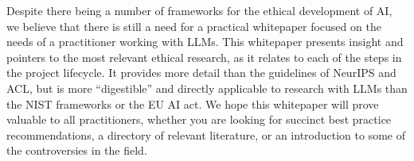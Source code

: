 Despite there being a number of frameworks for the ethical development of AI, we believe that there is still a need for a practical whitepaper focused on the needs of a practitioner working with LLMs. This whitepaper presents insight and pointers to the most relevant ethical research, as it relates to each of the steps in the project lifecycle. It provides more detail than the guidelines of NeurIPS and ACL, but is more ``digestible'' and directly applicable to research with LLMs than the NIST frameworks or the EU AI act. We hope this whitepaper will prove valuable to all practitioners, whether you are looking for succinct best practice recommendations, a directory of relevant literature, or an introduction to some of the controversies in the field. 




